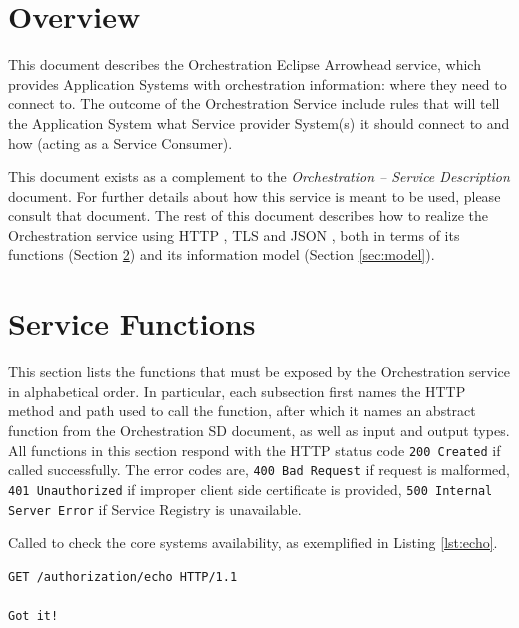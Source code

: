 \documentclass[a4paper]{arrowhead}
\newcommand{\fref}[1]{{\textcolor{ArrowheadBlue}{\hyperref[sec:functions:#1]{#1}}}}
\begin{document}
\section{Overview}
\label{sec:overview}

This document describes the Orchestration Eclipse Arrowhead service, which provides Application Systems with orchestration information: where they need to connect to. The outcome of the Orchestration Service include rules that will tell the Application System what Service provider System(s) it should connect to and how (acting as a Service Consumer). 

This document exists as a complement to the \textit{Orchestration -- Service Description} document.
For further details about how this service is meant to be used, please consult that document.
The rest of this document describes how to realize the Orchestration service using HTTP \cite{fielding2014hypertext}, TLS \cite{rescorla2018transport} and JSON \cite{bray2014json}, both in terms of its functions (Section \ref{sec:functions}) and its information model (Section \ref{sec:model}).

\newpage

\section{Service Functions}
\label{sec:functions}

This section lists the functions that must be exposed by the Orchestration service in alphabetical order.
In particular, each subsection first names the HTTP method and path used to call the function, after which it names an abstract function from the Orchestration SD document, as well as input and output types.
All functions in this section respond with the HTTP status code \texttt{200 Created} if called successfully. The error codes are, \texttt{400 Bad Request} if request is malformed, \texttt{401 Unauthorized} if improper client side certificate is provided, \texttt{500 Internal Server Error} if Service Registry is unavailable.


Called to check the core systems availability, as exemplified in Listing \ref{lst:echo}.

\begin{lstlisting}[language=http,label={lst:echo},caption={An \fref{Echo} invocation response.}]
GET /authorization/echo HTTP/1.1

Got it!
\end{lstlisting}
\end{document}
